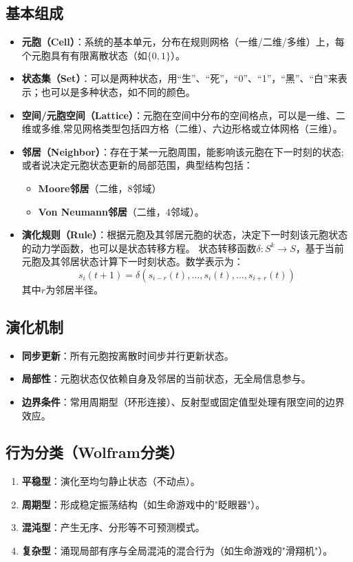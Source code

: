 \documentclass[forprint]{WHUBachelor}
\begin{document}
\subsection{基本组成}
\begin{itemize}
    \item \textbf{元胞（Cell）}：系统的基本单元，分布在规则网格（一维/二维/多维）上，每个元胞具有有限离散状态（如$\{0,1\}$）。
    \item \textbf{状态集（Set）}：可以是两种状态，用“生”、“死”，“0”、“1”，“黑”、“白”来表示；也可以是多种状态，如不同的颜色。
    \item \textbf{空间/元胞空间（Lattice）}：元胞在空间中分布的空间格点，可以是一维、二维或多维,常见网格类型包括四方格（二维）、六边形格或立体网格（三维）。
    \item \textbf{邻居（Neighbor）}：存在于某一元胞周围，能影响该元胞在下一时刻的状态;或者说决定元胞状态更新的局部范围，典型结构包括：
    \begin{itemize}
        \item \textbf{Moore邻居}（二维，8邻域）
        \item \textbf{Von Neumann邻居}（二维，4邻域）。
    \end{itemize}
    \item \textbf{演化规则（Rule）}：根据元胞及其邻居元胞的状态，决定下一时刻该元胞状态的动力学函数，也可以是状态转移方程。  
    状态转移函数$\delta: S^k \to S$，基于当前元胞及其邻居状态计算下一时刻状态。数学表示为：
    $$
    s_i(t+1) = \delta\left(s_{i-r}(t), \ldots, s_i(t), \ldots, s_{i+r}(t)\right)
    $$
    其中$r$为邻居半径。
\end{itemize}


\subsection{演化机制}
\begin{itemize}
    \item \textbf{同步更新}：所有元胞按离散时间步并行更新状态。
    \item \textbf{局部性}：元胞状态仅依赖自身及邻居的当前状态，无全局信息参与。
    \item \textbf{边界条件}：常用周期型（环形连接）、反射型或固定值型处理有限空间的边界效应。
\end{itemize}

\subsection{行为分类（Wolfram分类）}
\begin{enumerate}
    \item \textbf{平稳型}：演化至均匀静止状态（不动点）。
    \item \textbf{周期型}：形成稳定振荡结构（如生命游戏中的"眨眼器"）。
    \item \textbf{混沌型}：产生无序、分形等不可预测模式。
    \item \textbf{复杂型}：涌现局部有序与全局混沌的混合行为（如生命游戏的"滑翔机"）。
\end{enumerate}
\end{document}

